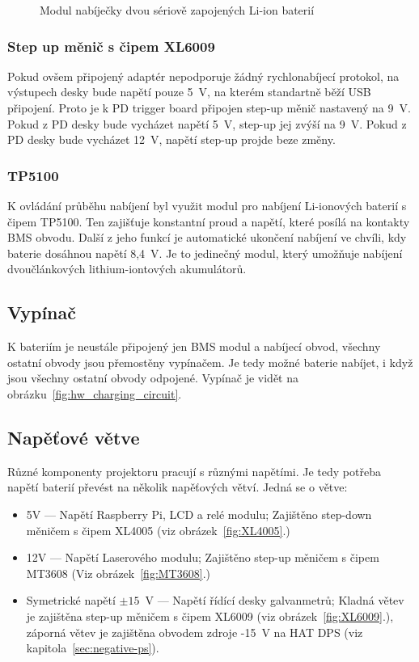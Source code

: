\begin{figure}[htb]
\begin{minipage}{0.3\textwidth}
    \caption{\label{fig:TP5100} Modul nabíječky dvou sériově zapojených Li-ion baterií~\cite{laskakit-TP5100}}
  \end{minipage}
\end{figure}

\subsubsection{Step up měnič s čipem XL6009}
Pokud ovšem připojený adaptér nepodporuje žádný rychlonabíjecí protokol, na výstupech desky bude napětí pouze 5~V, na kterém standartně běží USB připojení. Proto je k PD trigger board připojen step-up měnič nastavený na 9~V.
Pokud z PD desky bude vycházet napětí 5~V, step-up jej zvýší na 9~V. Pokud z PD desky bude vycházet 12~V, napětí step-up projde beze změny.

\subsubsection{TP5100}
K ovládání průběhu nabíjení byl využit modul pro nabíjení Li-ionových baterií s čipem TP5100. Ten zajišťuje konstantní proud a napětí, které posílá na kontakty BMS obvodu. Další z jeho funkcí je automatické ukončení nabíjení ve chvíli, kdy baterie dosáhnou napětí 8,4~V. Je to jedinečný modul, který umožňuje nabíjení dvoučlánkových lithium-iontových akumulátorů.

\subsection{Vypínač}
K bateriím je neustále připojený jen BMS modul a nabíjecí obvod, všechny ostatní obvody jsou přemostěny vypínačem. Je tedy možné baterie nabíjet, i když jsou všechny ostatní obvody odpojené. Vypínač je vidět na obrázku~\ref{fig:hw_charging_circuit}.

\subsection{Napěťové větve}
Různé komponenty projektoru pracují s různými napětími. Je tedy potřeba napětí baterií převést na několik napěťových větví. Jedná se o větve:

\begin{itemize}
  \item 5V --- Napětí Raspberry Pi, LCD a relé modulu; Zajištěno step-down měničem s čipem XL4005 (viz obrázek~\ref{fig:XL4005}.)
  \item 12V --- Napětí Laserového modulu; Zajištěno step-up měničem s čipem MT3608 (Viz obrázek~\ref{fig:MT3608}.)
  \item Symetrické napětí $\pm{}15$~V --- Napětí řídící desky galvanmetrů; Kladná větev je zajištěna step-up měničem s čipem XL6009 (viz obrázek~\ref{fig:XL6009}.), záporná větev je zajištěna obvodem zdroje -15~V na HAT DPS (viz kapitola~\ref{sec:negative-ps}).
\end{itemize}


